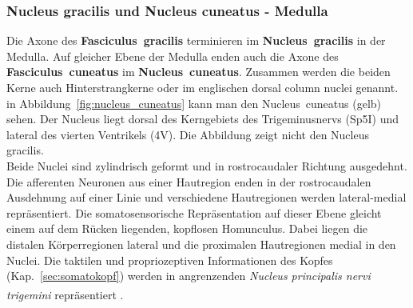 \documentclass[12pt,a4paper,pdftex]{article}
\begin{document}
\subsubsection*{Nucleus gracilis und Nucleus cuneatus - Medulla}

Die Axone des \textbf{Fasciculus~gracilis} terminieren im \textbf{Nucleus~gracilis}  in der Medulla. Auf gleicher Ebene der Medulla enden auch die Axone des \textbf{Fasciculus~cuneatus} im \textbf{Nucleus~cuneatus}. Zusammen werden die beiden Kerne auch Hinterstrangkerne  oder im englischen dorsal column nuclei genannt. in Abbildung~\ref{fig:nucleus_cuneatus} kann man den Nucleus~cuneatus (gelb) sehen. Der Nucleus liegt dorsal des Kerngebiets des Trigeminusnervs (Sp5I) und lateral des vierten Ventrikels (4V). Die Abbildung zeigt nicht den Nucleus gracilis.
\\
\noindent
Beide Nuclei sind zylindrisch geformt und in rostrocaudaler Richtung ausgedehnt. Die afferenten Neuronen aus einer Hautregion enden in der rostrocaudalen Ausdehnung auf einer Linie und verschiedene Hautregionen werden lateral-medial repräsentiert. Die somatosensorische Repräsentation auf dieser Ebene gleicht einem auf dem Rücken liegenden, kopflosen Homunculus. Dabei liegen die distalen Körperregionen lateral und die proximalen Hautregionen medial in den Nuclei. Die taktilen und propriozeptiven Informationen des Kopfes (Kap.~\ref{sec:somatokopf}) werden in angrenzenden \textit{Nucleus principalis nervi trigemini}  repräsentiert \textsuperscript{\cite[22]{kandel2013principles}}. 
\\
\end{document}
